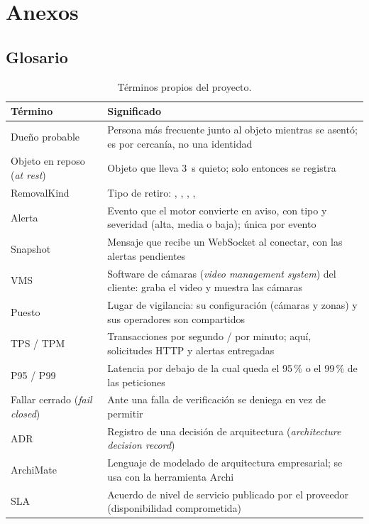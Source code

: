 \chapter{Anexos}

\section{Glosario}\label{sec:glosario}
\begin{table}[H]
\centering\small
\caption{Términos propios del proyecto.}\label{tab:glosario}
\begin{tabularx}{\textwidth}{lY}
\toprule
\textbf{Término} & \textbf{Significado} \\
\midrule
Dueño probable & Persona más frecuente junto al objeto mientras se asentó; es por cercanía, no una identidad \\
Objeto en reposo (\emph{at rest}) & Objeto que lleva 3~s quieto; solo entonces se registra \\
RemovalKind & Tipo de retiro: , , , ,  \\
Alerta & Evento que el motor convierte en aviso, con tipo y severidad (alta, media o baja); única por evento \\
Snapshot & Mensaje que recibe un WebSocket al conectar, con las alertas pendientes \\
VMS & Software de cámaras (\emph{video management system}) del cliente: graba el video y muestra las cámaras \\
Puesto & Lugar de vigilancia: su configuración (cámaras y zonas) y sus operadores son compartidos \\
TPS / TPM & Transacciones por segundo / por minuto; aquí, solicitudes HTTP y alertas entregadas \\
P95 / P99 & Latencia por debajo de la cual queda el 95\,\% o el 99\,\% de las peticiones \\
Fallar cerrado (\emph{fail closed}) & Ante una falla de verificación se deniega en vez de permitir \\
ADR & Registro de una decisión de arquitectura (\emph{architecture decision record}) \\
ArchiMate & Lenguaje de modelado de arquitectura empresarial; se usa con la herramienta Archi \\
SLA & Acuerdo de nivel de servicio publicado por el proveedor (disponibilidad comprometida) \\
\bottomrule
\end{tabularx}
\end{table}

